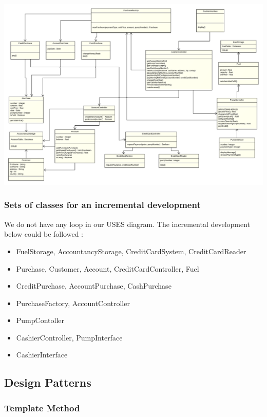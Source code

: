 \documentclass[11pt, a4paper]{article}
\begin{document}
\begin{center}
\centerline{\includegraphics[angle=90, origin=c, width=1\textwidth]{use.png}}
\end{center}


\subsubsection*{Sets of classes for an incremental development}
We do not have any loop in our USES diagram. The incremental development below could be followed :
\begin{itemize}
\item FuelStorage, AccountancyStorage, CreditCardSystem, CreditCardReader
\item Purchase, Customer, Account, CreditCardController, Fuel
\item CreditPurchase, AccountPurchase, CashPurchase
\item PurchaseFactory, AccountController
\item PumpContoller
\item CashierController, PumpInterface
\item CashierInterface
\end{itemize}



\newpage
\subsection*{Design Patterns}

\subsubsection*{Template Method}
\end{document}
